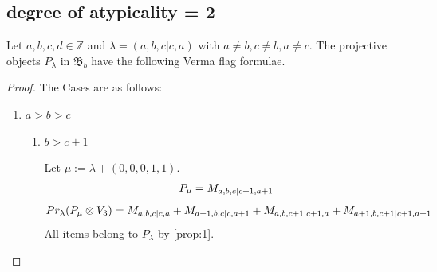 
\subsection{degree of atypicality = 2}
\begin{theorem}
  Let $a,b,c,d \in \mathbb{Z}$ and $\lambda = (a,b,c|c,a)$ with $a \neq b, c\neq b,a \neq c$. The projective objects $P_{\lambda}$ in $\mathfrak{B}_{b}$ have the following Verma flag formulae.
\end{theorem}
\begin{proof} The Cases are as follows:\par
\begin{enumerate}
  \item $a>b>c$ 
    \begin{enumerate}
      \item $b>c+1$ \par
        Let $\mu:=\lambda + (0,0,0,1,1) $.
        \begin{equation}\notag
          \begin{aligned}
            P_\mu = M_{a,b,c|c+1,a+1}
          \end{aligned}
        \end{equation}
        \begin{equation}\notag
          \begin{aligned}
            Pr_{\lambda}(P_\mu \otimes V_{3}) &=
M_{a,b,c|c,a}
+ M_{a+1,b,c|c,a+1}
+ M_{a,b,c+1|c+1,a}
+ M_{a+1,b,c+1|c+1,a+1} 
          \end{aligned}
        \end{equation}
All items belong to $P_\lambda$ by \cref{prop:1}.


\end{enumerate}
\end{enumerate}
\end{proof}
